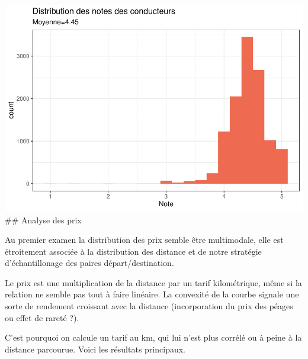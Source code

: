 \documentclass[
]{book}
\begin{document}
\includegraphics{bookdown-demo_files/figure-latex/0907-1.pdf}
\#\# Analyse des prix

Au premier examen la distribution des prix semble être multimodale, elle est étroitement associée à la distribution des distance et de notre stratégie d'échantillonage des paires départ/destination.

Le prix est une multiplication de la distance par un tarif kilométrique, même si la relation ne semble pas tout à faire linéaire. La convexité de la courbe signale une sorte de rendement croissant avec la distance (incorporation du prix des péages ou effet de rareté ?).

C'est pourquoi on calcule un tarif au km, qui lui n'est plus corrélé ou à peine à la distance parcourue. Voici les résultats principaux.
\end{document}
